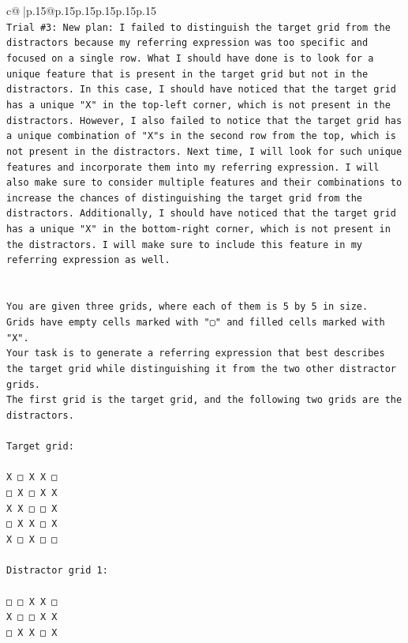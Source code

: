 \documentclass{article}
\begin{document}
{\begin{supertabular}{c@{$\;$}|p{.15\linewidth}@{}p{.15\linewidth}p{.15\linewidth}p{.15\linewidth}p{.15\linewidth}p{.15\linewidth}}
{{{\\ 
\texttt{Trial \#3: New plan: I failed to distinguish the target grid from the distractors because my referring expression was too specific and focused on a single row. What I should have done is to look for a unique feature that is present in the target grid but not in the distractors. In this case, I should have noticed that the target grid has a unique "X" in the top{-}left corner, which is not present in the distractors. However, I also failed to notice that the target grid has a unique combination of "X"s in the second row from the top, which is not present in the distractors. Next time, I will look for such unique features and incorporate them into my referring expression. I will also make sure to consider multiple features and their combinations to increase the chances of distinguishing the target grid from the distractors. Additionally, I should have noticed that the target grid has a unique "X" in the bottom{-}right corner, which is not present in the distractors. I will make sure to include this feature in my referring expression as well.} \\
\\ 
\\ 
\texttt{You are given three grids, where each of them is 5 by 5 in size.} \\
\texttt{Grids have empty cells marked with "▢" and filled cells marked with "X".} \\
\texttt{Your task is to generate a referring expression that best describes the target grid while distinguishing it from the two other distractor grids.} \\
\texttt{The first grid is the target grid, and the following two grids are the distractors.} \\
\\ 
\texttt{Target grid:} \\
\\ 
\texttt{X □ X X □} \\
\texttt{□ X □ X X} \\
\texttt{X X □ □ X} \\
\texttt{□ X X □ X} \\
\texttt{X □ X □ □} \\
\\ 
\texttt{Distractor grid 1:} \\
\\ 
\texttt{□ □ X X □} \\
\texttt{X □ □ X X} \\
\texttt{□ X X □ X} \\
}}}
\end{supertabular}}
\end{document}
